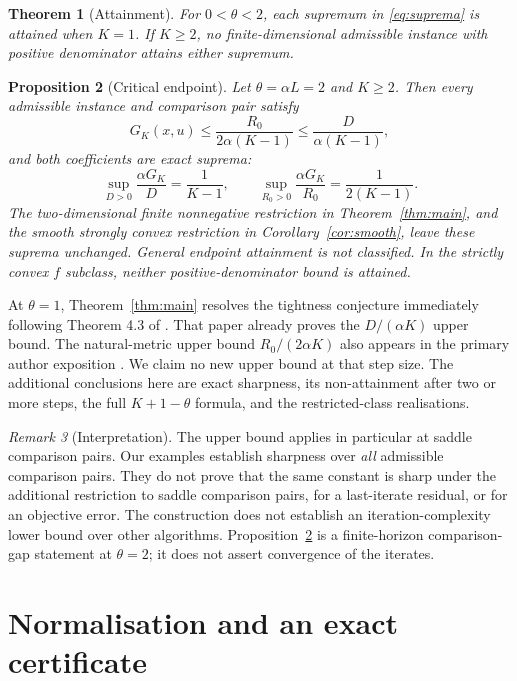 \documentclass[11pt,a4paper]{article}
\newtheorem{theorem}{Theorem}
\newtheorem{proposition}[theorem]{Proposition}
\theoremstyle{remark}\newtheorem{remark}[theorem]{Remark}
\begin{document}
\begin{theorem}[Attainment]\label{thm:attainment}
For $0<\theta<2$, each supremum in \eqref{eq:suprema} is attained when $K=1$. If $K\ge2$, no finite-dimensional admissible instance with positive denominator attains either supremum.
\end{theorem}

\begin{proposition}[Critical endpoint]\label{prop:endpoint}
Let $\theta=\alpha L=2$ and $K\ge2$. Then every admissible instance and comparison pair satisfy
\[
G_K(x,u)\le\frac{R_0}{2\alpha(K-1)}
\le\frac{D}{\alpha(K-1)},
\]
and both coefficients are exact suprema:
\[
\sup_{D>0}\frac{\alpha G_K}{D}=\frac1{K-1},\qquad
\sup_{R_0>0}\frac{\alpha G_K}{R_0}=\frac1{2(K-1)}.
\]
The two-dimensional finite nonnegative restriction in Theorem~\ref{thm:main}, and the smooth strongly convex restriction in Corollary~\ref{cor:smooth}, leave these suprema unchanged. General endpoint attainment is not classified. In the strictly convex $f$ subclass, neither positive-denominator bound is attained.
\end{proposition}

At $\theta=1$, Theorem~\ref{thm:main} resolves the tightness conjecture immediately following Theorem 4.3 of \cite{nguyen2025}. That paper already proves the $D/(\alpha K)$ upper bound. The natural-metric upper bound $R_0/(2\alpha K)$ also appears in the primary author exposition \cite{pedregosa2018}. We claim no new upper bound at that step size. The additional conclusions here are exact sharpness, its non-attainment after two or more steps, the full $K+1-\theta$ formula, and the restricted-class realisations.

\begin{remark}[Interpretation]
The upper bound applies in particular at saddle comparison pairs. Our examples establish sharpness over \emph{all} admissible comparison pairs. They do not prove that the same constant is sharp under the additional restriction to saddle comparison pairs, for a last-iterate residual, or for an objective error. The construction does not establish an iteration-complexity lower bound over other algorithms. Proposition~\ref{prop:endpoint} is a finite-horizon comparison-gap statement at $\theta=2$; it does not assert convergence of the iterates.
\end{remark}

\section{Normalisation and an exact certificate}
\end{document}
